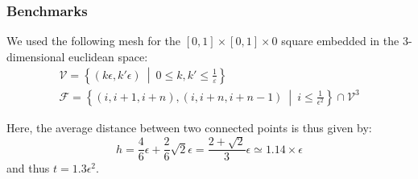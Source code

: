 \documentclass{beamercours}
\def\mF{\mathcal{F}}
\def\mV{\mathcal{V}}
\begin{document}
\begin{frame}[allowframebreaks]
	\frametitle{Benchmarks}
	We used the following mesh for the $\left[ 0, 1 \right] \times \left[ 0, 1 \right] \times 0$ square embedded in the $3$-dimensional euclidean space:
	\begin{align*}
		\mV = \left\{ \left( k\epsilon, k'\epsilon \right) \ \middle| \ 0 \leq k, k' \leq \frac{1}{\varepsilon} \right\}\\
		\mF = \left\{ \left( i, i + 1, i + n \right), \left( i, i + n, i + n -1 \right) \ \middle| \ i \leq \frac{1}{\epsilon^{2}} \right\} \cap \mV^{3}
	\end{align*}
	\framebreak

	Here, the average distance between two connected points is thus given by:
	\begin{equation*}
		h = \frac{4}{6}\epsilon + \frac{2}{6}\sqrt{2}\epsilon = \frac{2 + \sqrt{2}}{3}\epsilon \simeq 1.14 \times \epsilon
	\end{equation*}
	and thus $t = 1.3\epsilon^{2}$.

\end{frame}
\end{document}
